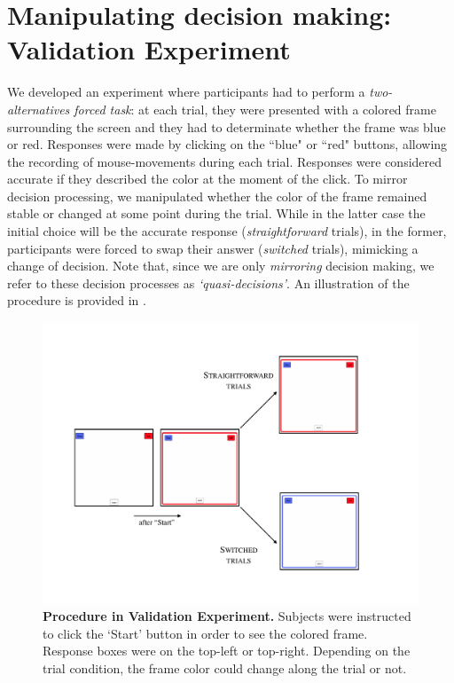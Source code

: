 \documentclass{article}
\begin{document}
\section{Manipulating decision making: Validation Experiment}
\label{section:validation}

We developed an experiment where participants had to perform a \emph{two-alternatives forced task}: at each trial, they were presented with a colored frame surrounding the screen and they had to determinate whether the frame was blue or red. 
Responses were made by clicking on the ``blue" or ``red" buttons, allowing the recording of mouse-movements during each trial. Responses were considered accurate if they described the color at the moment of the click. 
To mirror decision processing, we manipulated whether the color of the frame remained stable or changed at some point during the trial. 
While in the latter case the initial choice will be the accurate response (\textit{straightforward} trials), in the former, participants were forced to swap their answer (\textit{switched} trials), mimicking a change of decision. Note that, since we are only \emph{mirroring} decision making, we refer to these decision processes as \emph{`quasi-decisions'}.   
An illustration of the procedure is provided in . 



\begin{figure}
\centering
\includegraphics[scale=.5]{procedure.pdf}
\caption{\textbf{Procedure in Validation Experiment.} Subjects were instructed to click the `Start' button in order to see the colored frame. Response boxes were on the top-left or top-right. Depending on the trial condition, the frame color could change along the trial or not.} \label{fig:procedure.example}
\end{figure}
\end{document}
